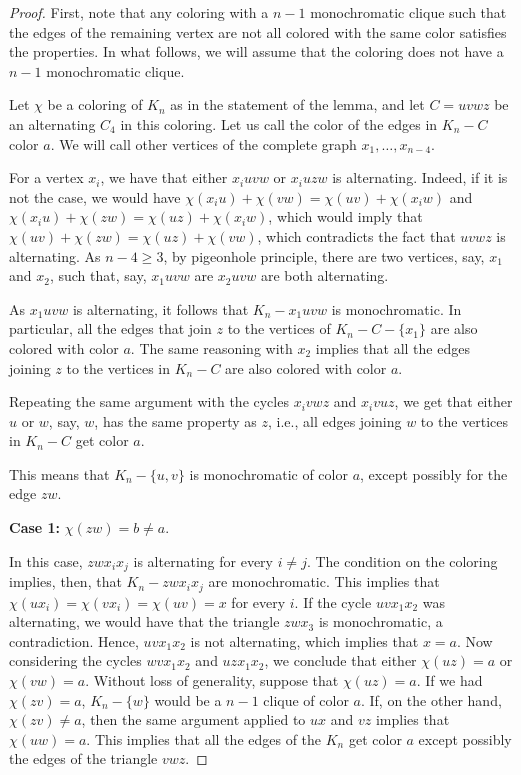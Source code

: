 \documentclass[11pt]{article}
\begin{document}
\begin{proof}
    First, note that any coloring with a $n-1$ monochromatic clique such that the edges of the remaining vertex are not all colored with the same color satisfies the properties. In what follows, we will assume that the coloring does not have a $n-1$ monochromatic clique.

    \medskip

    Let $\chi$ be a coloring of $K_n$ as in the statement of the lemma, and let $C=uvwz$ be an alternating $C_4$ in this coloring. Let us call the color of the edges in $K_n-C$ color $a$. We will call other vertices of the complete graph $x_1, \dots, x_{n-4}$.

    For a vertex $x_i$, we have that either $x_iuvw$ or $x_iuzw$ is alternating. Indeed, if it is not the case, we would have $\chi(x_iu)+\chi(vw)=\chi(uv)+\chi(x_iw)$ and $\chi(x_iu)+\chi(zw)=\chi(uz)+\chi(x_iw)$, which would imply that $\chi(uv)+\chi(zw)=\chi(uz)+\chi(vw)$, which contradicts the fact that $uvwz$ is alternating. As $n-4 \geq 3$, by pigeonhole principle, there are two vertices, say, $x_1$ and $x_2$, such that, say, $x_1uvw$ are $x_2uvw$ are both alternating.

    As $x_1uvw$ is alternating, it follows that $K_n-x_1uvw$ is monochromatic. In particular, all the edges that join $z$ to the vertices of $K_n-C-\{x_1\}$ are also colored with color $a$. The same reasoning with $x_2$ implies that all the edges joining $z$ to the vertices in $K_n-C$ are also colored with color $a$.

    Repeating the same argument with the cycles $x_ivwz$ and $x_ivuz$, we get that either $u$ or $w$, say, $w$, has the same property as $z$, i.e., all edges joining $w$ to the vertices in $K_n-C$ get color $a$.

    This means that $K_{n}-\{u,v\}$ is monochromatic of color $a$, except possibly for the edge $zw$.

    \medskip

    \textbf{Case 1:} $\chi(zw)=b \neq a$.

    In this case, $zwx_ix_j$ is alternating for every $i \neq j$. The condition on the coloring implies, then, that $K_n-zwx_ix_j$ are monochromatic. This implies that $\chi(ux_i)=\chi(vx_i)=\chi(uv)=x$ for every $i$. If the cycle $uvx_1x_2$ was alternating, we would have that the triangle $zwx_3$ is monochromatic, a contradiction. Hence, $uvx_1x_2$ is not alternating, which implies that $x=a$. Now considering the cycles $wvx_1x_2$ and $uzx_1x_2$, we conclude that either $\chi(uz)=a$ or $\chi(vw)=a$. Without loss of generality, suppose that $\chi(uz)=a$. If we had $\chi(zv)=a$, $K_n-\{w\}$ would be a $n-1$ clique of color $a$. If, on the other hand, $\chi(zv) \neq a$, then the same argument applied to $ux$ and $vz$ implies that $\chi(uw)=a$. This implies that all the edges of the $K_n$ get color $a$ except possibly the edges of the triangle $vwz$.


\end{proof}
\end{document}
